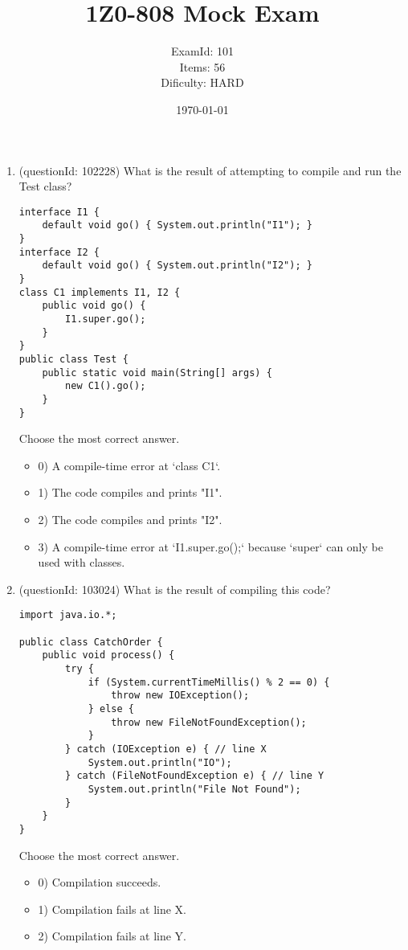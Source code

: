 \documentclass[12pt]{article}
\title{\textbf{1Z0-808 Mock Exam}}
\author{ExamId: 101 \\ Items: 56 \\ Dificulty: HARD}
\date{\today}
\begin{document}
\maketitle
\newpage\begin{enumerate}[label=(\arabic*)]
\item (questionId: 102228) What is the result of attempting to compile and run the Test class?\n\begin{verbatim}
interface I1 {
    default void go() { System.out.println("I1"); }
}
interface I2 {
    default void go() { System.out.println("I2"); }
}
class C1 implements I1, I2 {
    public void go() {
        I1.super.go();
    }
}
public class Test {
    public static void main(String[] args) {
        new C1().go();
    }
}
\end{verbatim}
Choose the most correct answer. 
\begin{itemize}
\item 0) A compile-time error at `class C1`.

\item 1) The code compiles and prints "I1".

\item 2) The code compiles and prints "I2".

\item 3) A compile-time error at `I1.super.go();` because `super` can only be used with classes.

\end{itemize}
\item (questionId: 103024) What is the result of compiling this code?
\begin{verbatim}
import java.io.*;

public class CatchOrder {
    public void process() {
        try {
            if (System.currentTimeMillis() % 2 == 0) {
                throw new IOException();
            } else {
                throw new FileNotFoundException();
            }
        } catch (IOException e) { // line X
            System.out.println("IO");
        } catch (FileNotFoundException e) { // line Y
            System.out.println("File Not Found");
        }
    }
}
\end{verbatim}
Choose the most correct answer. 
\begin{itemize}
\item 0) Compilation succeeds.

\item 1) Compilation fails at line X.

\item 2) Compilation fails at line Y.


\end{itemize}
\end{enumerate}
\end{document}
